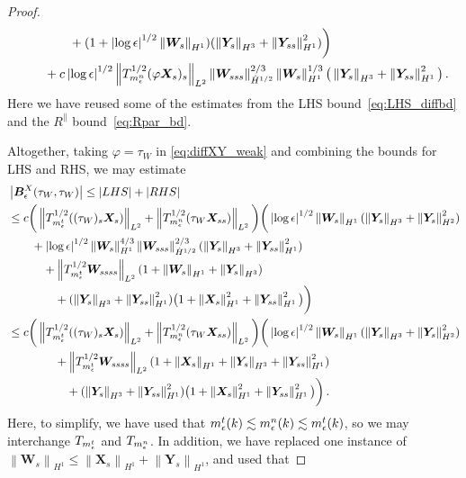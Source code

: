 \documentclass[10pt,a4paper]{amsart}
\newcommand{\X}{\bm{X}}
\newcommand{\Y}{\bm{Y}}
\newcommand{\abs}[1]{\left\lvert #1 \right\rvert}
\newcommand{\norm}[1]{\left\lVert #1 \right\rVert}
\begin{document}
\begin{proof}
\begin{equation}
\begin{aligned}
  &\qquad\qquad +(1+\abs{\log\epsilon}^{1/2}\norm{\bm{W}_s}_{H^1})(\norm{\Y_s}_{H^3}+\norm{\Y_{ss}}_{H^1}^2) \bigg) \\
  &\qquad + c\abs{\log\epsilon}^{1/2}\norm{T_{m_\epsilon^{\rm n}}^{1/2}(\varphi\X_s)_s}_{L^2}\norm{\bm{W}_{sss}}_{\dot H^{1/2}}^{2/3}\norm{\bm{W}_s}_{H^1}^{1/3}\big( \norm{\Y_s}_{H^3}+ \norm{\Y_{ss}}_{H^1}^2\big)\,.
\end{aligned}
\end{equation}
Here we have reused some of the estimates from the LHS bound~\eqref{eq:LHS_diffbd} and the $R^\parallel$ bound~\eqref{eq:Rpar_bd}.



Altogether, taking $\varphi=\tau_W$ in \eqref{eq:diffXY_weak} and combining the bounds for LHS and RHS, we may estimate 
\begin{equation}\label{eq:BXtautau}
\begin{aligned}
  &\abs{\bm{B}_\epsilon^X(\tau_W,\tau_W)}\le \abs{\rm LHS} + \abs{\rm RHS}\\
  &\le c\bigg( \norm{T_{m_\epsilon^{\rm t}}^{1/2}((\tau_W)_s\X_s)}_{L^2} + 
  \norm{T_{m_\epsilon^{\rm n}}^{1/2}(\tau_W\X_{ss})}_{L^2}\bigg)\bigg(\abs{\log\epsilon}^{1/2}\norm{\bm{W}_s}_{H^1}(\norm{\Y_s}_{H^3}+\norm{\Y_s}_{H^2}^2)\\
  &\qquad  + \abs{\log\epsilon}^{1/2}\norm{\bm{W}_s}_{H^1}^{4/3}\norm{\bm{W}_{sss}}_{\dot H^{1/2}}^{2/3}(\norm{\Y_s}_{H^3}+\norm{\Y_{ss}}_{H^1}^2)\\
  &\qquad\quad + \norm{T_{m_\epsilon^{\rm t}}^{1/2}\bm{W}_{ssss}}_{L^2}(1+\norm{\bm{W}_s}_{H^1}+\norm{\Y_s}_{H^3})\\
  &\qquad\qquad + (\norm{\Y_s}_{H^3}+\norm{\Y_{ss}}_{H^1}^2)\big(1 + \norm{\X_s}_{H^1}^2 + \norm{\Y_{ss}}_{H^1}^2\big)\bigg)\\
  &\le c\bigg( \norm{T_{m_\epsilon^{\rm t}}^{1/2}((\tau_W)_s\X_s)}_{L^2} + 
  \norm{T_{m_\epsilon^{\rm n}}^{1/2}(\tau_W\X_{ss})}_{L^2}\bigg)\bigg(\abs{\log\epsilon}^{1/2}\norm{\bm{W}_s}_{H^1}(\norm{\Y_s}_{H^3}+\norm{\Y_s}_{H^2}^2)\\
  &\qquad\qquad  + \norm{T_{m_\epsilon^{\rm t}}^{1/2}\bm{W}_{ssss}}_{L^2}(1+\norm{\X_s}_{H^1}+\norm{\Y_s}_{H^3}+\norm{\Y_{ss}}_{H^1}^2)\\
  &\qquad\qquad\quad + (\norm{\Y_s}_{H^3}+\norm{\Y_{ss}}_{H^1}^2)\big(1 + \norm{\X_s}_{H^1}^2 + \norm{\Y_{ss}}_{H^1}^2\big)\bigg)\,.
\end{aligned}
\end{equation}
Here, to simplify, we have used that $m_\epsilon^{\rm t}(k)\lesssim m_\epsilon^{\rm n}(k) \lesssim m_\epsilon^{\rm t}(k)$, so we may interchange $T_{m_\epsilon^{\rm t}}$ and $T_{m_\epsilon^{\rm n}}$. In addition, we have replaced one instance of $\norm{\bm{W}_s}_{H^1}\le \norm{\X_s}_{H^1}+\norm{\Y_s}_{H^1}$, and used that

\end{proof}
\end{document}
